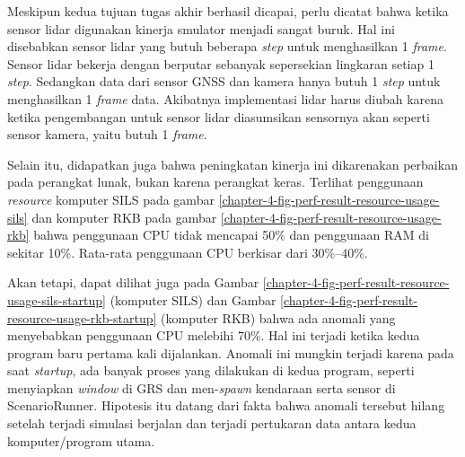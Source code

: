 Meskipun kedua tujuan tugas akhir berhasil dicapai, perlu dicatat bahwa ketika
sensor lidar digunakan kinerja smulator menjadi sangat buruk. Hal ini disebabkan
sensor lidar yang butuh beberapa \textit{step} untuk menghasilkan 1
\textit{frame}. Sensor lidar bekerja dengan berputar sebanyak sepersekian
lingkaran setiap 1 \textit{step}. Sedangkan data dari sensor GNSS dan kamera
hanya butuh 1 \textit{step} untuk menghasilkan 1 \textit{frame} data. Akibatnya
implementasi lidar harus diubah karena ketika pengembangan untuk sensor lidar
diasumsikan sensornya akan seperti sensor kamera, yaitu butuh 1 \textit{frame}.

Selain itu, didapatkan juga bahwa peningkatan kinerja ini dikarenakan perbaikan
pada perangkat lunak, bukan karena perangkat keras. Terlihat penggunaan
\textit{resource} komputer SILS pada gambar
\ref{chapter-4-fig-perf-result-resource-usage-sils} dan komputer RKB pada gambar
\ref{chapter-4-fig-perf-result-resource-usage-rkb} bahwa penggunaan CPU tidak
mencapai 50\% dan penggunaan RAM di sekitar 10\%. Rata-rata penggunaan CPU
berkisar dari 30\%--40\%.

Akan tetapi, dapat dilihat juga pada Gambar
\ref{chapter-4-fig-perf-result-resource-usage-sils-startup} (komputer SILS) dan
Gambar \ref{chapter-4-fig-perf-result-resource-usage-rkb-startup} (komputer RKB)
bahwa ada anomali yang menyebabkan penggunaan CPU melebihi 70\%. Hal ini terjadi
ketika kedua program baru pertama kali dijalankan. Anomali ini mungkin terjadi
karena pada saat \textit{startup}, ada banyak proses yang dilakukan di kedua
program, seperti menyiapkan \textit{window} di GRS dan men-\textit{spawn}
kendaraan serta sensor di ScenarioRunner. Hipotesis itu datang dari fakta bahwa
anomali tersebut hilang setelah terjadi simulasi berjalan dan terjadi pertukaran
data antara kedua komputer/program utama.
